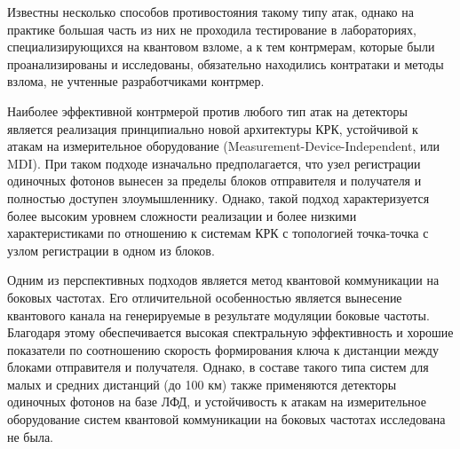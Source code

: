 	Известны несколько способов противостояния такому типу атак, однако на практике большая часть из них не проходила тестирование в лабораториях, специализирующихся на квантовом взломе, а к тем контрмерам, которые были проанализированы и исследованы, обязательно находились контратаки и методы взлома, не учтенные разработчиками контрмер. 
	
	Наиболее эффективной контрмерой против любого тип атак на детекторы является реализация принципиально новой архитектуры КРК, устойчивой к атакам на измерительное оборудование (Measurement-Device-Independent, или MDI). При таком подходе изначально предполагается, что узел регистрации одиночных фотонов вынесен за пределы блоков отправителя и получателя и полностью доступен злоумышленнику. Однако, такой подход характеризуется более высоким уровнем сложности реализации и более низкими характеристиками по отношению к системам КРК с топологией точка-точка с узлом регистрации в одном из блоков. 
	
	Одним из перспективных подходов является метод квантовой коммуникации на боковых частотах. Его отличительной особенностью является вынесение квантового канала на генерируемые в результате модуляции боковые частоты. Благодаря этому обеспечивается высокая спектральную эффективность и хорошие показатели по соотношению скорость формирования ключа к дистанции между блоками отправителя и получателя. Однако, в составе такого типа систем для малых и средних дистанций (до 100 км) также применяются детекторы одиночных фотонов на базе ЛФД, и устойчивость к атакам на измерительное оборудование систем квантовой коммуникации на боковых частотах исследована не была. 

